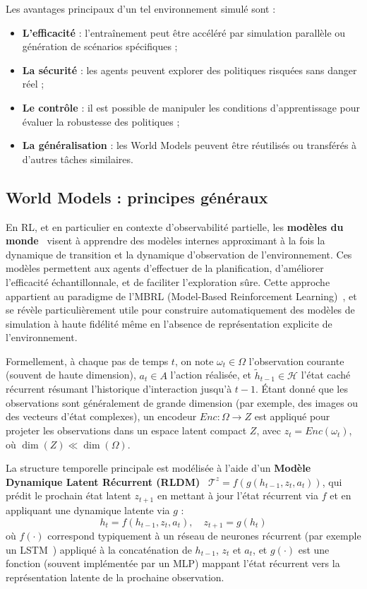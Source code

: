 Les avantages principaux d'un tel environnement simulé sont :
\begin{itemize}
    \item \textbf{L'efficacité} : l'entraînement peut être accéléré par simulation parallèle ou génération de scénarios spécifiques ;
    \item \textbf{La sécurité} : les agents peuvent explorer des politiques risquées sans danger réel ;
    \item \textbf{Le contrôle} : il est possible de manipuler les conditions d'apprentissage pour évaluer la robustesse des politiques ;
    \item \textbf{La généralisation} : les World Models peuvent être réutilisés ou transférés à d'autres tâches similaires.
\end{itemize}

\subsection{World Models : principes généraux}

En \ac{RL}, et en particulier en contexte d'observabilité partielle, les \textbf{modèles du monde}~\cite{ha2018recurrent, hafner2020dream} visent à apprendre des modèles internes approximant à la fois la dynamique de transition et la dynamique d'observation de l'environnement. Ces modèles permettent aux agents d'effectuer de la planification, d'améliorer l'efficacité échantillonnale, et de faciliter l'exploration sûre. Cette approche appartient au paradigme de l'\ac{MBRL} (Model-Based Reinforcement Learning)~\cite{moerland2020model}, et se révèle particulièrement utile pour construire automatiquement des modèles de simulation à haute fidélité même en l'absence de représentation explicite de l'environnement.

Formellement, à chaque pas de temps $t$, on note $\omega_t \in \Omega$ l'observation courante (souvent de haute dimension), $a_t \in A$ l'action réalisée, et $\tilde{h}_{t-1} \in \mathcal{H}$ l'état caché récurrent résumant l'historique d'interaction jusqu'à $t-1$. Étant donné que les observations sont généralement de grande dimension (par exemple, des images ou des vecteurs d'état complexes), un encodeur $Enc: \Omega \rightarrow Z$ est appliqué pour projeter les observations dans un espace latent compact $Z$, avec $z_t = Enc(\omega_t)$, où $\dim(Z) \ll \dim(\Omega)$.

La structure temporelle principale est modélisée à l'aide d'un \textbf{Modèle Dynamique Latent Récurrent (\ac{RLDM})}~\cite{hafner2020dream} $\mathcal{T}^{z} = f(g(h_{t-1}, z_t, a_t))$, qui prédit le prochain état latent $z_{t+1}$ en mettant à jour l'état récurrent via $f$ et en appliquant une dynamique latente via $g$ :
\[
h_t = f(h_{t-1}, z_t, a_t), \quad z_{t+1} = g(h_t)
\]
où $f(\cdot)$ correspond typiquement à un réseau de neurones récurrent (par exemple un \ac{LSTM}~\cite{hochreiter1997long}) appliqué à la concaténation de $h_{t-1}$, $z_t$ et $a_t$, et $g(\cdot)$ est une fonction (souvent implémentée par un \ac{MLP}) mappant l'état récurrent vers la représentation latente de la prochaine observation.

